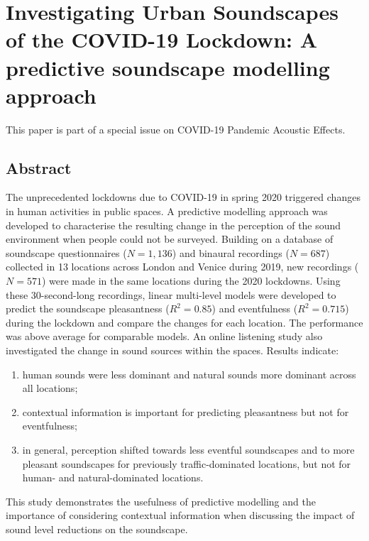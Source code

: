 \chapter{Investigating Urban Soundscapes of the COVID-19 Lockdown: A predictive soundscape modelling approach}
\label{ch:lockdown}

This paper is part of a special issue on COVID-19 Pandemic Acoustic Effects.


\section*{Abstract} %
 The unprecedented lockdowns due to COVID-19 in spring 2020 triggered changes in human activities in public spaces. A predictive modelling approach was developed to characterise the resulting change in the perception of the sound environment when people could not be surveyed. Building on a database of soundscape questionnaires ($N = 1,136$) and binaural recordings ($N = 687$) collected in 13 locations across London and Venice during 2019, new recordings ($N = 571$) were made in the same locations during the 2020 lockdowns. Using these 30-second-long recordings, linear multi-level models were developed to predict the soundscape pleasantness ($R^2=0.85$) and eventfulness ($R^2=0.715$) during the lockdown and compare the changes for each location. The performance was above average for comparable models. An online listening study also investigated the change in sound sources within the spaces. Results indicate:

 \begin{enumerate}
   \item human sounds were less dominant and natural sounds more dominant across all locations;
   \item contextual information is important for predicting pleasantness but not for eventfulness;
   \item in general, perception shifted towards less eventful soundscapes and to more pleasant soundscapes for previously traffic-dominated locations, but not for human- and natural-dominated locations.
 \end{enumerate}

 This study demonstrates the usefulness of predictive modelling and the importance of considering contextual information when discussing the impact of sound level reductions on the soundscape.

